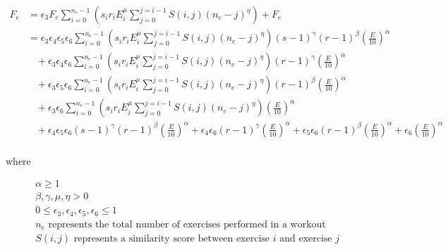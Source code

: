 \begin{minipage}{\textwidth}
	\begin{equation}
		\label{eq:P2C1_InterWorkoutFatigue}
		\begin{split}
			F_e & = 
			\epsilon_3 F_e 
			\sum_{i=0}^{n_e-1} \left( 
				s_i r_i E_i^\mu 
				\sum_{j=0}^{j=i-1} S(i,j)(n_e-j)^\eta
			\right)
			+ F_e
			\\
			& =
			\epsilon_3 \epsilon_4 \epsilon_5 \epsilon_6
			\sum_{i=0}^{n_e-1} \left( 
				s_i r_i E_i^\mu 
				\sum_{j=0}^{j=i-1} S(i,j)(n_e-j)^\eta
			\right)
			(s-1)^\gamma 
			(r-1)^\beta
			\left(
				\frac{E}{10} 
			\right)^\alpha
			\\
			& \;\;\; +
			\epsilon_3 \epsilon_4 \epsilon_6
			\sum_{i=0}^{n_e-1} \left( 
				s_i r_i E_i^\mu 
				\sum_{j=0}^{j=i-1} S(i,j)(n_e-j)^\eta
			\right)
			(r-1)^\gamma
			\left(
				\frac{E}{10} 
			\right)^\alpha
			\\
			& \;\;\; +
			\epsilon_3 \epsilon_5 \epsilon_6
			\sum_{i=0}^{n_e-1} \left( 
				s_i r_i E_i^\mu 
				\sum_{j=0}^{j=i-1} S(i,j)(n_e-j)^\eta
			\right)
			(r-1)^\beta
			\left(
				\frac{E}{10} 
			\right)^\alpha
			\\
			& \;\;\; +
			\epsilon_3 \epsilon_6
			\sum_{i=0}^{n_e-1} \left( 
				s_i r_i E_i^\mu 
				\sum_{j=0}^{j=i-1} S(i,j)(n_e-j)^\eta
			\right)
			\left(
				\frac{E}{10} 
			\right)^\alpha
			\\
			& \;\;\; +
			\epsilon_4 \epsilon_5 \epsilon_6
			(s-1)^\gamma 
			(r-1)^\beta
			\left(
				\frac{E}{10} 
			\right)^\alpha
			+
			\epsilon_4 \epsilon_6 
			(r-1)^\gamma
			\left(
				\frac{E}{10} 
			\right)^\alpha
			+
			\epsilon_5 \epsilon_6 
			(r-1)^\beta
			\left(
				\frac{E}{10} 
			\right)^\alpha
			+
			\epsilon_6
			\left(
				\frac{E}{10} 
			\right)^\alpha
			\\
		\end{split}
	\end{equation}
	\centerline{where}
	\begin{equation*}
		\begin{split}
		    & \alpha \ge 1 \\
		    & \beta,\gamma, \mu, \eta > 0 \\
			& 0 \le \epsilon_3, \epsilon_4, \epsilon_5, \epsilon_6 \le 1 \\
			& n_e \text{ represents the total number of exercises performed in a workout} \\
			& S(i,j) \text{ represents a similarity score between exercise }i \text{ and exercise }j \\
		\end{split}
	\end{equation*}
\end{minipage}\\

